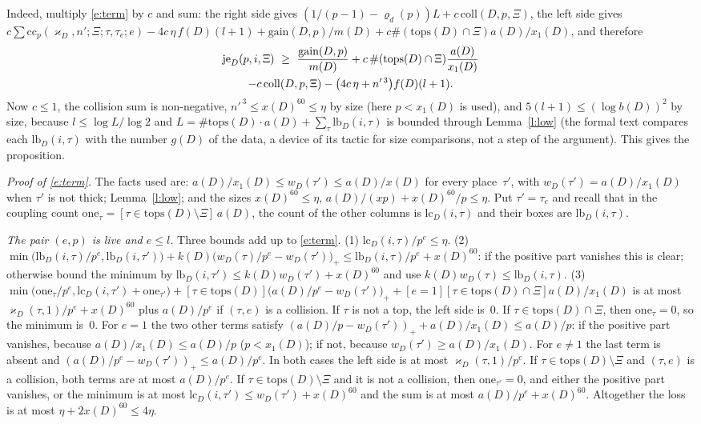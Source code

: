 \documentclass[11pt,a4paper]{article}
\makeatletter
\theoremstyle{plainx}
\theoremstyle{uprightx}
\renewenvironment{proof}[1][Proof]{\par\pushQED{\qed}\normalfont\topsep0pt\partopsep0pt
  \trivlist\item[\hskip\labelsep\itshape #1.]\ignorespaces}{\popQED\endtrivlist\@endpefalse}
\newcommand{\xD}[1]{x(#1)}
\newcommand{\xoD}[1]{x_1(#1)}
\newcommand{\bD}[1]{b(#1)}
\newcommand{\mD}[1]{m(#1)}
\newcommand{\fD}[1]{f(#1)}
\newcommand{\kD}[1]{k(#1)}
\newcommand{\aD}[1]{a(#1)}
\newcommand{\tops}[1]{\mathrm{tops}(#1)}
\newcommand{\nomW}[2]{w_{#1}(#2)}
\newcommand{\gD}[1]{g(#1)}
\newcommand{\gain}[2]{\mathrm{gain}(#1,#2)}
\newcommand{\coll}[3]{\mathrm{coll}(#1,#2,#3)}
\newcommand{\cc}[7]{\mathrm{cc}_{#1}(#2,#3;#4;#5,#6;#7)}
\newcommand{\kap}[3]{\varkappa_{#1}(#2,#3)}
\newcommand{\kapD}[1]{\varkappa_{#1}}
\newcommand{\nsw}[2]{\varrho_{#1}(#2)}
\newcommand{\lc}[3]{\mathrm{lc}_{#1}(#2,#3)}
\newcommand{\lb}[3]{\mathrm{lb}_{#1}(#2,#3)}
\makeatother
\begin{document}
\begin{proof}
Indeed, multiply \eqref{e:term} by $c$ and sum: the right side gives
$(1/(p-1)-\nsw{d}{p})L+c\,\coll{D}{p}{\Xi}$, the left side gives
$c\sum\cc{p}{\kapD{D}}{n'}{\Xi}{\tau}{\tau_e}{e}-4c\,\eta\,\fD{D}(l+1)+\gain{D}{p}/\mD{D}+c\#(\tops{D}\cap\Xi)\aD{D}/\xoD{D}$,
and therefore
\begin{multline*}
\jetexp{p}{i}{\Xi}\ \ge\ \frac{\gain{D}{p}}{\mD{D}}+c\,\#(\tops{D}\cap\Xi)\frac{\aD{D}}{\xoD{D}}\\
-c\,\coll{D}{p}{\Xi}-\bigl(4c\,\eta+n'^{\,3}\bigr)\fD{D}(l+1).
\end{multline*}
Now $c\le1$, the collision sum is non-negative, $n'^{\,3}\le \xD{D}^{60}\le\eta$ by size (here $p<\xoD{D}$ is used), and
$5(l+1)\le(\log \bD{D})^2$ by size, because $l\le\log L/\log2$ and
$L=\#\tops{D}\cdot\aD{D}+\sum_\tau\lb{D}{i}{\tau}$ is bounded through Lemma~\ref{l:low} (the formal text compares
each $\lb{D}{i}{\tau}$ with the number $\gD{D}$ of the data, a device of its tactic for size comparisons, not a
step of the argument). This gives the proposition.

\emph{Proof of \eqref{e:term}.} The facts used are: $\aD{D}/\xoD{D}\le\nomW{D}{\tau'}\le\aD{D}/\xD{D}$ for every
place~$\tau'$, with $\nomW{D}{\tau'}=\aD{D}/\xoD{D}$ when $\tau'$ is not thick; Lemma~\ref{l:low}; and the sizes
$\xD{D}^{60}\le\eta$, $\aD{D}/(xp)+\xD{D}^{60}/p\le\eta$. Put $\tau'=\tau_e$ and recall that in the coupling count
$\mathrm{one}_\tau=[\tau\in\tops{D}\setminus\Xi]\,\aD{D}$, the count of the other columns is $\lc{D}{i}{\tau}$ and their boxes
are $\lb{D}{i}{\tau}$.

\emph{The pair $(e,p)$ is live and $e\le l$.} Three bounds add up to \eqref{e:term}.
(1) $\lc{D}{i}{\tau}/p^{e}\le\eta$.
(2) $\min\bigl(\lb{D}{i}{\tau}/p^{e},\lb{D}{i}{\tau'}\bigr)+\kD{D}\bigl(\nomW{D}{\tau}/p^{e}-\nomW{D}{\tau'}\bigr)_+\le\lb{D}{i}{\tau}/p^{e}+\xD{D}^{60}$:
if the positive part vanishes this is clear; otherwise bound the minimum by
$\lb{D}{i}{\tau'}\le\kD{D}\nomW{D}{\tau'}+\xD{D}^{60}$ and use $\kD{D}\nomW{D}{\tau}\le\lb{D}{i}{\tau}$.
(3) $\min\bigl(\mathrm{one}_\tau/p^{e},\lc{D}{i}{\tau'}+\mathrm{one}_{\tau'}\bigr)+[\tau\in\tops{D}]\bigl(\aD{D}/p^{e}-\nomW{D}{\tau'}\bigr)_++[e=1][\tau\in\tops{D}\cap\Xi]\aD{D}/\xoD{D}$
is at most $\kap{D}{\tau}{1}/p^{e}+\xD{D}^{60}$ plus $\aD{D}/p^{e}$ if $(\tau,e)$ is a collision. If $\tau$ is not a
top, the left side is~$0$. If $\tau\in\tops{D}\cap\Xi$, then $\mathrm{one}_\tau=0$, so the minimum is~$0$. For $e=1$ the two other
terms satisfy $(\aD{D}/p-\nomW{D}{\tau'})_++\aD{D}/\xoD{D}\le\aD{D}/p$: if the positive part vanishes, because
$\aD{D}/\xoD{D}\le\aD{D}/p$ ($p<\xoD{D}$); if not, because $\nomW{D}{\tau'}\ge\aD{D}/\xoD{D}$. For $e\ne1$ the last term is
absent and $(\aD{D}/p^{e}-\nomW{D}{\tau'})_+\le\aD{D}/p^{e}$. In both cases the left side is at most
$\kap{D}{\tau}{1}/p^{e}$. If $\tau\in\tops{D}\setminus\Xi$ and $(\tau,e)$ is a collision, both terms are at most $\aD{D}/p^{e}$.
If $\tau\in\tops{D}\setminus\Xi$ and it is not a collision, then $\mathrm{one}_{\tau'}=0$, and either the positive part
vanishes, or the minimum is at most $\lc{D}{i}{\tau'}\le\nomW{D}{\tau'}+\xD{D}^{60}$ and the sum is at most
$\aD{D}/p^{e}+\xD{D}^{60}$. Altogether the loss is at most $\eta+2\xD{D}^{60}\le4\eta$.


\end{proof}
\end{document}
